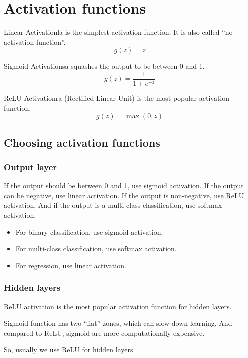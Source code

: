 \section{Activation functions}
\begin{dfnbox}{Linear Activation}{la}
     is the simplest activation function. 
    It is also called ``no activation function''.
    \begin{equation}
        g(z) = z
    \end{equation}
\end{dfnbox}

\begin{dfnbox}{Sigmoid Activation}{sa}
     squashes the output to be between 0 and 1.
    \begin{equation}
        g(z) = \frac{1}{1 + e^{-z}}
    \end{equation}
\end{dfnbox}

\begin{dfnbox}{ReLU Activation}{ra}
     (Rectified Linear Unit) is the most popular activation function.
    \begin{equation}
        g(z) = \max(0, z)
    \end{equation}
\end{dfnbox}

\subsection*{Choosing activation functions}
\subsubsection*{Output layer}
If the output should be between 0 and 1, use sigmoid activation. If the output can be negative, use linear activation.
If the output is non-negative, use ReLU activation. And if the output is a multi-class classification, use softmax activation. 
\begin{itemize}
    \item For binary classification, use sigmoid activation.
    \item For multi-class classification, use softmax activation.
    \item For regression, use linear activation.    
\end{itemize}
\subsubsection*{Hidden layers}
ReLU activation is the most popular activation function for hidden layers.\par
Sigmoid function has two ``flat'' zones, which can slow down learning.
And compared to ReLU, sigmoid are more computationally expensive.\par
So, usually we use ReLU for hidden layers.

